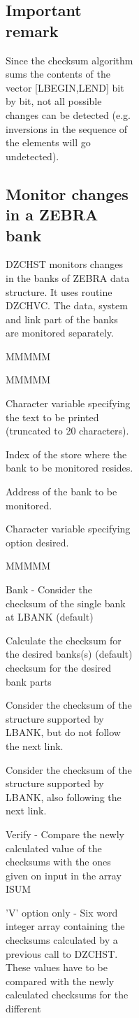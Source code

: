 \begin{figure}
\begin{figure}
\begin{figure}
\begin{figure}
\subsection{Important remark}
\par Since the checksum algorithm
sums the contents of the vector [LBEGIN,LEND]
bit by bit, not all possible changes can be detected (e.g. inversions
in the sequence of the elements will go undetected).
\subsection{Monitor changes in a ZEBRA bank}
\par DZCHST monitors changes in the banks of ZEBRA data structure.
It uses routine DZCHVC.
The data, system and link part of the banks are monitored separately.
\begin{DL}{MMMMM}
\item[Input:
]
\begin{DL}{MMMMM}
\item[CHTEXT
]Character variable specifying the text to be printed
(truncated to 20 characters).
\item[IXSTOR
]Index of the store where the bank to be monitored resides.
\item[LBANK
]Address of the bank to be monitored.
\item[CHOPT
]Character variable specifying option desired.
\begin{DL}{MMMMM}
\item['B'
]Bank - Consider the checksum of the single bank at LBANK (default)
\item['C'
]Calculate the checksum for the desired banks(s) (default)
 checksum for the desired bank parts
\item['D'
]Consider the checksum of the
structure supported by LBANK, but do not follow the next link.
\item['L'
]Consider the checksum of the
structure supported by LBANK, also following the next link.
\item['V'
]Verify - Compare the newly calculated value of the checksums with the
ones given on input in the array ISUM
\end{DL}
\item[*ISUM*
]'V' option only - Six word integer array containing the checksums
calculated by a previous call to DZCHST. These values have to be compared
with the newly calculated checksums for the different

\end{DL}
\end{DL}
\end{figure}
\end{figure}
\end{figure}
\end{figure}
